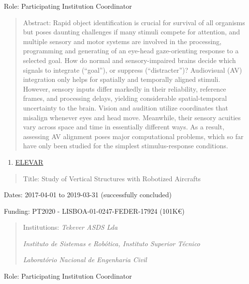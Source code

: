 Role: Participating Institution Coordinator

\begin{quote}
Abstract: Rapid object identification is crucial for survival of all
organisms but poses daunting challenges if many stimuli compete for
attention, and multiple sensory and motor systems are involved in the
processing, programming and generating of an eye-head gaze-orienting
response to a selected goal. How do normal and sensory-impaired brains
decide which signals to integrate (``goal''), or suppress
(``distracter'')? Audiovisual (AV) integration only helps for spatially
and temporally aligned stimuli. However, sensory inputs differ markedly
in their reliability, reference frames, and processing delays, yielding
considerable spatial-temporal uncertainty to the brain. Vision and
audition utilize coordinates that misalign whenever eyes and head move.
Meanwhile, their sensory acuities vary across space and time in
essentially different ways. As a result, assessing AV alignment poses
major computational problems, which so far have only been studied for
the simplest stimulus-response conditions.
\end{quote}

\begin{enumerate}
\def\labelenumi{\arabic{enumi}.}
\setcounter{enumi}{1}
\item
  \ul{ELEVAR}
\end{enumerate}

\begin{quote}
Title: Study of Vertical Structures with Robotized Aircrafts
\end{quote}

Dates: 2017-04-01 to 2019-03-31 (successfully concluded)

Funding: PT2020 - LISBOA-01-0247-FEDER-17924 (101K€)

\begin{quote}
Institutions: \emph{Tekever ASDS Lda}

\emph{Instituto de Sistemas e Robótica, Instituto Superior Técnico}

\emph{Laboratório Nacional de Engenharia Civil}
\end{quote}

Role: Participating Institution Coordinator

